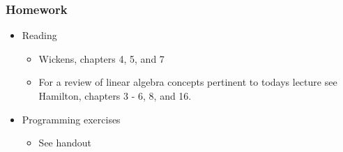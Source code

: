 \documentclass{beamer}
\begin{document}
\begin{frame}
  \frametitle{Homework}

\begin{itemize}
\item Reading

\begin{itemize}
 \item Wickens, chapters 4, 5, and 7
 \item For a review of linear algebra concepts pertinent to todays lecture see Hamilton, chapters 3 - 6, 8, and 16.
\end{itemize}

\item Programming exercises
\begin{itemize}
	\item See handout
\end{itemize}


\end{itemize}

\end{frame}
\end{document}
